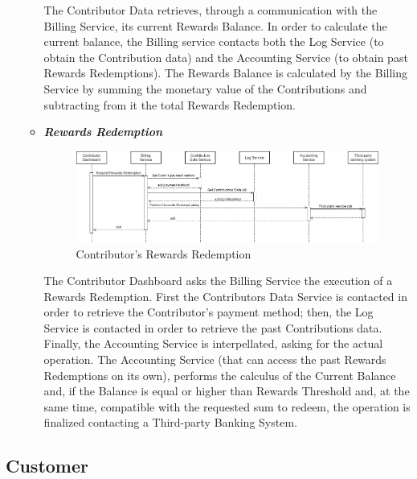 \begin{itemize}
\begin{itemize}
        The Contributor Data retrieves, through a communication with the Billing Service, its current Rewards Balance. In order to calculate the current balance, the Billing service contacts both the Log Service (to obtain the Contribution data) and the Accounting Service (to obtain past Rewards Redemptions). The Rewards Balance is calculated by the Billing Service by summing the monetary value of the Contributions and subtracting from it the total Rewards Redemption. 

        \item \textbf{\textit{Rewards Redemption}}\\
        \begin{figure}[!ht]
            \centering
            \includegraphics[width=\linewidth]{document/chapters/chapter_6/images/use_cases_satisfaction_rewards_redemption.jpg}
            \caption{Contributor's Rewards Redemption}
            \label{fig:use_cases_satisfaction_rewards_redemption}
        \end{figure}

        The Contributor Dashboard asks the Billing Service the execution of a Rewards Redemption. First the Contributors Data Service is contacted in order to retrieve the Contributor's payment method; then, the Log Service is contacted in order to retrieve the past Contributions data. Finally, the Accounting Service is interpellated, asking for the actual operation. The Accounting Service (that can access the past Rewards Redemptions on its own), performs the calculus of the Current Balance and, if the Balance is equal or higher than Rewards Threshold and, at the same time, compatible with the requested sum to redeem, the operation is finalized contacting a Third-party Banking System.

    \end{itemize}
\end{itemize}

\subsection{Customer}

